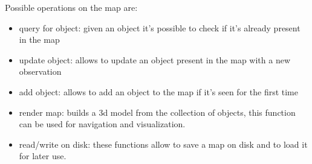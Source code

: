 \documentclass{article}
\begin{document}
	Possible operations on the map are:
	
	\begin{itemize}
		\item query for object: given an object it's possible to check if it's already present in the map
		\item update object: allows to update an object present in the map with a new observation
		\item add object: allows to add an object to the map if it's seen for the first time
		\item render map: builds a 3d model from the collection of objects, this function can be used for navigation and visualization.
		\item read/write on disk: these functions allow to save a map on disk and to load it for later use.
	\end{itemize}
	
	
	
	
	
\end{document}
